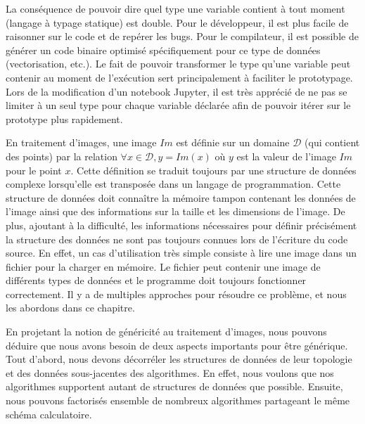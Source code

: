 La conséquence de pouvoir dire quel type une variable contient à tout moment (langage à typage statique) est double.
Pour le développeur, il est plus facile de raisonner sur le code et de repérer les bugs. Pour le compilateur, il est
possible de générer un code binaire optimisé spécifiquement pour ce type de données (vectorisation, etc.). Le fait de
pouvoir transformer le type qu'une variable peut contenir au moment de l'exécution sert principalement à faciliter le
prototypage. Lors de la modification d'un notebook Jupyter, il est très apprécié de ne pas se limiter à un seul type
pour chaque variable déclarée afin de pouvoir itérer sur le prototype plus rapidement.

En traitement d'images, une image \(Im\) est définie sur un domaine \(\mathcal{D}\) (qui contient des points) par la
relation \(\forall x \in \mathcal{D}, y = Im(x)\) où \(y\) est la valeur de l'image \(Im\) pour le point \(x\). Cette
définition se traduit toujours par une structure de données complexe lorsqu'elle est transposée dans un langage de
programmation. Cette structure de données doit connaître la mémoire tampon contenant les données de l'image ainsi que
des informations sur la taille et les dimensions de l'image. De plus, ajoutant à la difficulté, les informations
nécessaires pour définir précisément la structure des données ne sont pas toujours connues lors de l'écriture du code
source. En effet, un cas d'utilisation très simple consiste à lire une image dans un fichier pour la charger en mémoire.
Le fichier peut contenir une image de différents types de données et le programme doit toujours fonctionner
correctement. Il y a de multiples approches pour résoudre ce problème, et nous les abordons dans ce chapitre.

En projetant la notion de généricité au traitement d'images, nous pouvons déduire que nous avons besoin de deux aspects
importants pour être générique. Tout d'abord, nous devons décorréler les structures de données de leur topologie et des
données sous-jacentes des algorithmes. En effet, nous voulons que nos algorithmes supportent autant de structures de
données que possible. Ensuite, nous pouvons factorisés ensemble de nombreux algorithmes partageant le même schéma
calculatoire.

